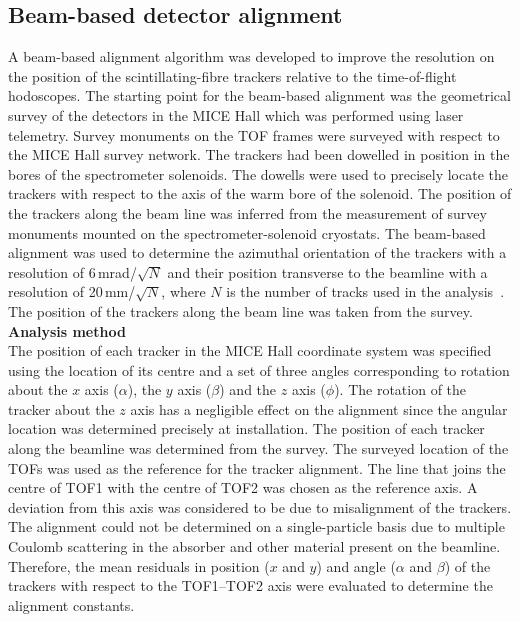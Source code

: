 \subsection{Beam-based detector alignment}
\label{SubSect:DA}

A beam-based alignment algorithm was developed to improve the
resolution on the position of the scintillating-fibre trackers
relative to the time-of-flight hodoscopes.
The starting point for the beam-based alignment was the geometrical
survey of the detectors in the MICE Hall which was performed using
laser telemetry. 
Survey monuments on the TOF frames were surveyed with respect to the
MICE Hall survey network.
The trackers had been dowelled in position in the bores of the
spectrometer solenoids.
The dowells were used to precisely locate the trackers with respect to
the axis of the warm bore of the solenoid.
The position of the trackers along the beam line was inferred from the
measurement of survey monuments mounted on the spectrometer-solenoid
cryostats.
The beam-based alignment was used to determine the azimuthal
orientation of the trackers with a resolution of 6\,mrad/$\sqrt{N}$
and their position transverse to the beamline with a resolution of
20\,mm/$\sqrt{N}$, where $N$ is the number of tracks used in the
analysis~\cite{2018arXiv1805.06623T}.
The position of the trackers along the beam line was taken from the
survey. \\

\noindent\textbf{Analysis method} \\
\label{SubSect:DA_Analysis}
\noindent The position of each tracker in the MICE Hall coordinate
system was specified using the location of its centre and a set of
three angles corresponding to rotation about the $x$ axis ($\alpha$),
the $y$ axis ($\beta$) and the $z$ axis ($\phi$).
The rotation of the tracker about the $z$ axis has a negligible effect
on the alignment since the angular location was determined precisely
at installation.
The position of each tracker along the beamline was determined from
the survey.
The surveyed location of the TOFs was used as the reference for the
tracker alignment.
The line that joins the centre of TOF1 with the centre of TOF2 was
chosen as the reference axis.
A deviation from this axis was considered to be due to misalignment
of the trackers.
The alignment could not be determined on a single-particle basis due
to multiple Coulomb scattering in the absorber and other material
present on the beamline.
Therefore, the mean residuals in position ($x$ and $y$) and angle
($\alpha$ and $\beta$) of the trackers with respect to the TOF1--TOF2
axis were evaluated to determine the alignment constants.

